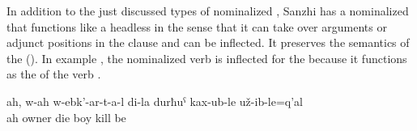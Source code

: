 In addition to the just discussed types of nominalized , Sanzhi has a nominalized  that functions like a headless  in the sense that it can take over arguments or adjunct positions in the clause and can be inflected. It preserves the semantics of the  (). In example , the nominalized verb   is inflected for the  because it functions as the  of the verb  .
%
\begin{exe}
	\ex	\label{ex:Ah, the ones who have one beloved (i.e. the owners), who have apparently killed my son, may they die}
	\gll	ah,	w-ah	w-ebk'-ar-t-a-l	di-la	durħuˁ	kax-ub-le	už-ib-le=q'al\\
		ah	owner	die		boy	kill	be\\
	\glt	{}
\end{exe}
